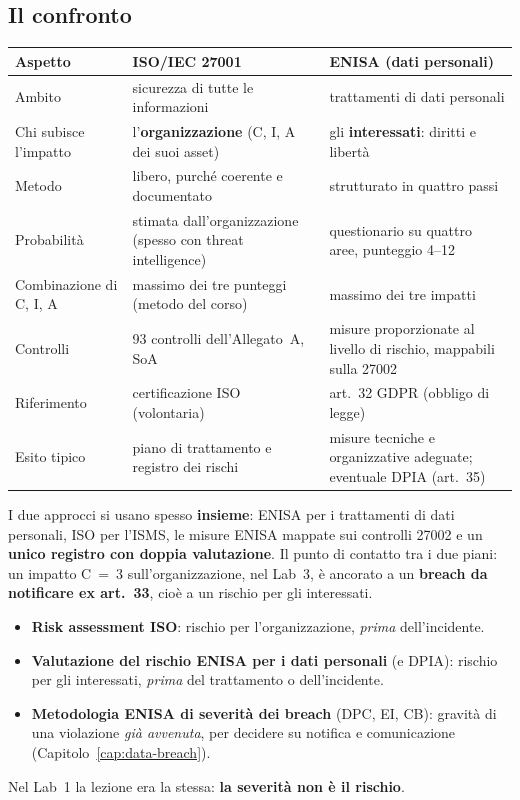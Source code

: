 \subsection{Il confronto}
\begin{center}
\small
\begin{tabularx}{\linewidth}{>{\raggedright\arraybackslash}p{2.5cm} X X}
\toprule
\textbf{Aspetto} & \textbf{ISO/IEC 27001} & \textbf{ENISA (dati personali)}\\
\midrule
Ambito & sicurezza di tutte le informazioni & trattamenti di dati personali\\
Chi subisce l'impatto & l'\textbf{organizzazione} (C, I, A dei suoi asset) & gli
  \textbf{interessati}: diritti e libertà\\
Metodo & libero, purché coerente e documentato & strutturato in quattro passi\\
Probabilità & stimata dall'organizzazione (spesso con threat intelligence) & questionario su quattro aree,
  punteggio 4--12\\
Combinazione di C, I, A & massimo dei tre punteggi (metodo del corso) & massimo dei tre impatti\\
Controlli & 93 controlli dell'Allegato~A, SoA & misure proporzionate al livello di rischio, mappabili sulla
  27002\\
Riferimento & certificazione ISO (volontaria) & art.~32 GDPR (obbligo di legge)\\
Esito tipico & piano di trattamento e registro dei rischi & misure tecniche e organizzative adeguate;
  eventuale DPIA (art.~35)\\
\bottomrule
\end{tabularx}
\end{center}
I due approcci si usano spesso \textbf{insieme}: ENISA per i trattamenti di dati personali, ISO per l'ISMS,
le misure ENISA mappate sui controlli 27002 e un \textbf{unico registro con doppia valutazione}. Il punto di
contatto tra i due piani: un impatto C~=~3 sull'organizzazione, nel Lab~3, è ancorato a un \textbf{breach
da notificare ex art.~33}, cioè a un rischio per gli interessati.

\begin{nota}
\begin{itemize}
  \item \textbf{Risk assessment ISO}: rischio per l'organizzazione, \emph{prima} dell'incidente.
  \item \textbf{Valutazione del rischio ENISA per i dati personali} (e DPIA): rischio per gli interessati,
    \emph{prima} del trattamento o dell'incidente.
  \item \textbf{Metodologia ENISA di severità dei breach} (DPC, EI, CB): gravità di una violazione
    \emph{già avvenuta}, per decidere su notifica e comunicazione (Capitolo~\ref{cap:data-breach}).
\end{itemize}
Nel Lab~1 la lezione era la stessa: \textbf{la severità non è il rischio}.
\end{nota}

